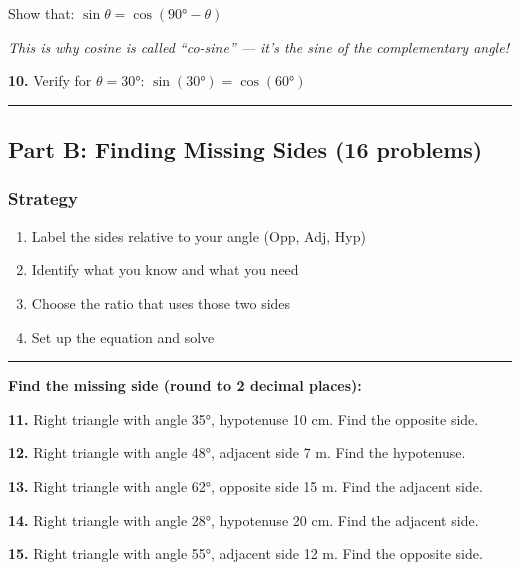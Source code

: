 \documentclass[
  11pt,
]{article}
\providecommand{\tightlist}{%
  \setlength{\itemsep}{0pt}\setlength{\parskip}{0pt}}
\begin{document}
Show that: \(\sin\theta = \cos(90° - \theta)\)

\emph{This is why cosine is called ``co-sine'' --- it's the sine of the
complementary angle!}

\textbf{10.} Verify for \(\theta = 30°\): \(\sin(30°) = \cos(60°)\)

\begin{center}\rule{0.5\linewidth}{0.5pt}\end{center}

\hypertarget{part-b-finding-missing-sides-16-problems}{%
\subsection{Part B: Finding Missing Sides (16
problems)}\label{part-b-finding-missing-sides-16-problems}}

\hypertarget{strategy}{%
\subsubsection{Strategy}\label{strategy}}

\begin{enumerate}
\def\labelenumi{\arabic{enumi}.}
\tightlist
\item
  Label the sides relative to your angle (Opp, Adj, Hyp)
\item
  Identify what you know and what you need
\item
  Choose the ratio that uses those two sides
\item
  Set up the equation and solve
\end{enumerate}

\begin{center}\rule{0.5\linewidth}{0.5pt}\end{center}

\textbf{Find the missing side (round to 2 decimal places):}

\textbf{11.} Right triangle with angle 35°, hypotenuse 10 cm. Find the
opposite side.

\textbf{12.} Right triangle with angle 48°, adjacent side 7 m. Find the
hypotenuse.

\textbf{13.} Right triangle with angle 62°, opposite side 15 m. Find the
adjacent side.

\textbf{14.} Right triangle with angle 28°, hypotenuse 20 cm. Find the
adjacent side.

\textbf{15.} Right triangle with angle 55°, adjacent side 12 m. Find the
opposite side.
\end{document}
